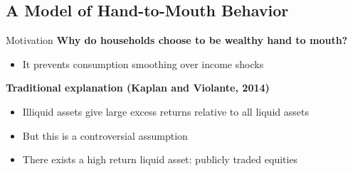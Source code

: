 \documentclass[10pt,english,t,10pt]{beamer}
\begin{document}
\subsection{A Model of Hand-to-Mouth Behavior}




\begin{frame} {Motivation} \label{question}
\bigskip
{\bf Why do households choose to be wealthy hand to mouth?}
\medskip
\begin{itemize}
	\item It prevents consumption smoothing over income shocks
\end{itemize}



\bigskip \bigskip \vfill 

\pause
{\bf Traditional explanation (Kaplan and Violante, 2014)}
\medskip
\begin{itemize}
	
	\item Illiquid assets give large excess returns relative to all liquid assets 
	\medskip
	
	\item But this is a controversial assumption
	
	\medskip 
	\item There exists a high return liquid asset: publicly traded equities
\end{itemize}


\end{frame}
\end{document}
